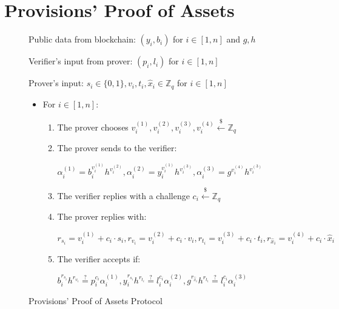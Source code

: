 \section{Provisions' Proof of Assets}\label{subsec:provisions-assets-proof}


\begin{figure}[h]
\begin{mdframed}
        Public data from blockchain: $(y_i, b_i)$ for $i \in [1, n]$ and $g, h$

        Verifier's input from prover: $(p_i, l_i)$ for $i \in [1, n]$

        Prover's input: $s_i \in \{0, 1\}, v_i,t_i,\hat{x}_i \in \mathbb{Z}_q$ for $i \in [1, n]$

    \begin{itemize}
        \item For $i \in [1, n]$:
            \begin{enumerate}
                \item The prover chooses $v_i^{(1)}, v_i^{(2)}, v_i^{(3)}, v_i^{(4)} \xleftarrow{\$} \mathbb{Z}_q$
                \item The prover sends to the verifier:

                    $
                        \alpha_i^{(1)} = b_i^{v_i^{(1)}}h^{v_i^{(2)}},
                        \alpha_i^{(2)} = y_i^{v_i^{(1)}}h^{v_i^{(3)}},
                        \alpha_i^{(3)} = g^{v_i^{(4)}}h^{v_i^{(3)}}
                    $
                \item The verifier replies with a challenge $c_i \xleftarrow{\$} \mathbb{Z}_q$
                \item The prover replies with:

                    $
                        r_{s_i} = v_i^{(1)} + c_i \cdot s_i,
                        r_{v_i} = v_i^{(2)} + c_i \cdot v_i,
                        r_{t_i} = v_i^{(3)} + c_i \cdot t_i,
                        r_{\hat{x}_i} = v_i^{(4)} + c_i \cdot \hat{x}_i
                    $
                \item The verifier accepts if:

                    $
                        b_i^{r_{s_i}}h^{r_{v_i}} \stackrel{?}{=} p_i^{c_i}\alpha_i^{(1)},
                        y_i^{r_{s_i}}h^{r_{t_i}} \stackrel{?}{=} l_i^{c_i}\alpha_i^{(2)},
                        g^{r_{\hat{x}_i}}h^{r_{t_i}} \stackrel{?}{=} l_i^{c_i}\alpha_i^{(3)}
                    $
            \end{enumerate}
    \end{itemize}

\end{mdframed}
\caption{Provisions' Proof of Assets Protocol}
\label{fig:provisions_assets_proto}
\end{figure}
